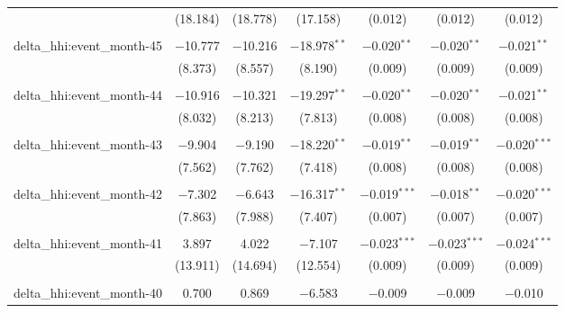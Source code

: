 \begin{table}[H]
{\begin{tabular}{@{\extracolsep{5pt}}lcccccc}
   & (18.184) & (18.778) & (17.158) & (0.012) & (0.012) & (0.012) \\  

   & & & & & & \\  

  delta\_hhi:event\_month-45 & $-$10.777 & $-$10.216 & $-$18.978$^{**}$ & $-$0.020$^{**}$ & $-$0.020$^{**}$ & $-$0.021$^{**}$ \\  

   & (8.373) & (8.557) & (8.190) & (0.009) & (0.009) & (0.009) \\  

   & & & & & & \\  

  delta\_hhi:event\_month-44 & $-$10.916 & $-$10.321 & $-$19.297$^{**}$ & $-$0.020$^{**}$ & $-$0.020$^{**}$ & $-$0.021$^{**}$ \\  

   & (8.032) & (8.213) & (7.813) & (0.008) & (0.008) & (0.008) \\  

   & & & & & & \\  

  delta\_hhi:event\_month-43 & $-$9.904 & $-$9.190 & $-$18.220$^{**}$ & $-$0.019$^{**}$ & $-$0.019$^{**}$ & $-$0.020$^{***}$ \\  

   & (7.562) & (7.762) & (7.418) & (0.008) & (0.008) & (0.008) \\  

   & & & & & & \\  

  delta\_hhi:event\_month-42 & $-$7.302 & $-$6.643 & $-$16.317$^{**}$ & $-$0.019$^{***}$ & $-$0.018$^{**}$ & $-$0.020$^{***}$ \\  

   & (7.863) & (7.988) & (7.407) & (0.007) & (0.007) & (0.007) \\  

   & & & & & & \\  

  delta\_hhi:event\_month-41 & 3.897 & 4.022 & $-$7.107 & $-$0.023$^{***}$ & $-$0.023$^{***}$ & $-$0.024$^{***}$ \\  

   & (13.911) & (14.694) & (12.554) & (0.009) & (0.009) & (0.009) \\  

   & & & & & & \\  

  delta\_hhi:event\_month-40 & 0.700 & 0.869 & $-$6.583 & $-$0.009 & $-$0.009 & $-$0.010 \\  


\end{tabular}}
\end{table}
